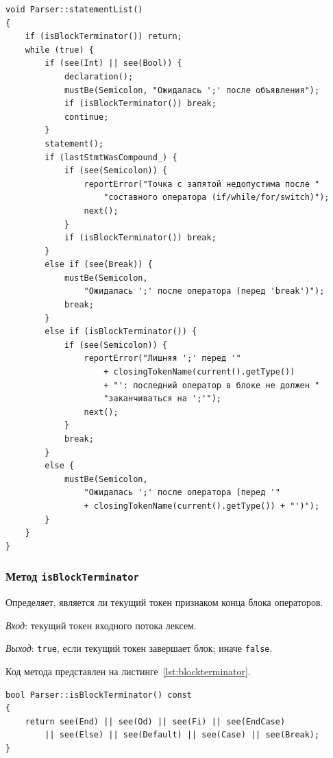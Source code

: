 \documentclass[a4paper,final]{article}
\begin{document}
\begin{lstlisting}[caption={Метод Parser::statementList}, label=lst:stmtlist]
void Parser::statementList()
{
    if (isBlockTerminator()) return;
    while (true) {
        if (see(Int) || see(Bool)) {
            declaration();
            mustBe(Semicolon, "Ожидалась ';' после объявления");
            if (isBlockTerminator()) break;
            continue;
        }
        statement();
        if (lastStmtWasCompound_) {
            if (see(Semicolon)) {
                reportError("Точка с запятой недопустима после "
                    "составного оператора (if/while/for/switch)");
                next();
            }
            if (isBlockTerminator()) break;
        }
        else if (see(Break)) {
            mustBe(Semicolon,
                "Ожидалась ';' после оператора (перед 'break')");
            break;
        }
        else if (isBlockTerminator()) {
            if (see(Semicolon)) {
                reportError("Лишняя ';' перед '"
                    + closingTokenName(current().getType())
                    + "': последний оператор в блоке не должен "
                    "заканчиваться на ';'");
                next();
            }
            break;
        }
        else {
            mustBe(Semicolon,
                "Ожидалась ';' после оператора (перед '"
                + closingTokenName(current().getType()) + "')");
        }
    }
}
\end{lstlisting}

\subsubsection*{Метод \texttt{isBlockTerminator}}

Определяет, является ли текущий токен признаком конца блока операторов.

\textit{Вход}: текущий токен входного потока лексем.

\textit{Выход}: \texttt{true}, если текущий токен
завершает блок; иначе \texttt{false}.

Код метода представлен на листинге~\ref{lst:blockterminator}.

\begin{lstlisting}[caption={Метод Parser::isBlockTerminator}, label=lst:blockterminator]
bool Parser::isBlockTerminator() const
{
    return see(End) || see(Od) || see(Fi) || see(EndCase)
        || see(Else) || see(Default) || see(Case) || see(Break);
}
\end{lstlisting}
\end{document}
